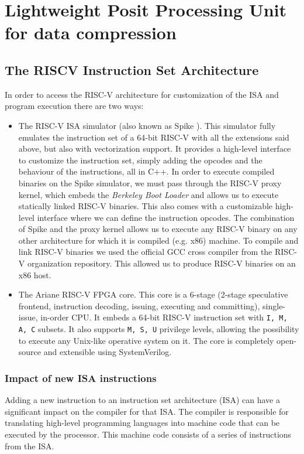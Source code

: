 \chapter{Lightweight Posit Processing Unit for data compression}\label{chap:posit_hw}




\section{The RISCV Instruction Set Architecture}

In order to access the RISC-V architecture for customization of the ISA and program execution there are two ways:
\begin{itemize}
    \item The RISC-V ISA simulator (also known as Spike \cite{riscvisasim}). This simulator fully emulates the instruction set of a 64-bit RISC-V with all the extensions said above, but also with vectorization support. It provides a high-level interface to customize the instruction set, simply adding the opcodes and the behaviour of the instructions, all in C++. In order to execute compiled binaries on the Spike simulator, we must pass through the RISC-V proxy kernel, which embeds the \textit{Berkeley Boot Loader} and allows us to execute statically linked RISC-V binaries. This also comes with a customizable high-level interface where we can define the instruction opcodes. The combination of Spike and the proxy kernel allows us to execute any RISC-V binary on any other architecture for which it is compiled (e.g. x86) machine. To compile and link RISC-V binaries we used the official GCC cross compiler from the RISC-V organization repository. This allowed us to produce RISC-V binaries on an x86 host.
    \item The Ariane RISC-V FPGA core. This core is a 6-stage (2-stage speculative frontend, instruction decoding, issuing, executing and committing), single-issue, in-order CPU. It embeds a 64-bit RISC-V instruction set with \texttt{I, M, A, C} subsets. It also supports \texttt{M, S, U} privilege levels, allowing the possibility to execute any Unix-like operative system on it. The core is completely open-source and extensible using SystemVerilog.
\end{itemize}

\subsection{Impact of new ISA instructions}
Adding a new instruction to an instruction set architecture (ISA) can have a significant impact on the compiler for that ISA. The compiler is responsible for translating high-level programming languages into machine code that can be executed by the processor. This machine code consists of a series of instructions from the ISA.

